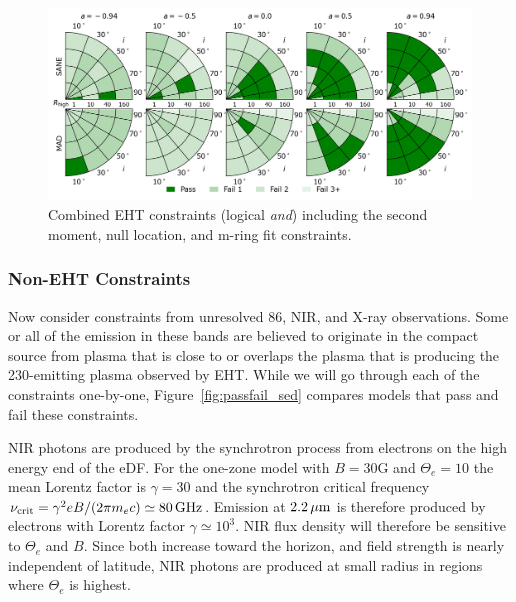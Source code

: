 \begin{figure}
  \centering
    \includegraphics[width=\textwidth]{./figures/Interferometric_Constraints.png}
  \caption{Combined EHT constraints (logical {\em and}) including the second moment, null location, and m-ring fit constraints.}
  \label{fig:all_EHT_constraints}
\end{figure}

\subsubsection{Non-EHT Constraints}

Now consider constraints from unresolved 86\GHz, NIR, and X-ray
observations.
Some or all of the emission in these bands are believed to originate
in the compact source from plasma that is close to or overlaps the
plasma that is producing the 230\GHz-emitting plasma observed by EHT.
While we will go through each of the constraints one-by-one,
Figure~\ref{fig:passfail_sed} compares models that pass and fail these
constraints.


NIR photons are produced by the synchrotron process from electrons on the high energy end of the eDF.  For the one-zone model with $B = 30$G and $\Theta_e = 10$ the mean Lorentz factor is $\gamma = 30$ and the synchrotron critical frequency $\nu_\mathrm{crit} = \gamma^2 e B/(2 \pi m_e c) \simeq 80\,\mathrm{GHz}$.  Emission at $2.2\,\mu\mathrm{m}$ is therefore produced by electrons with  Lorentz factor $\gamma \simeq 10^3$.  NIR flux density will therefore be sensitive to $\Theta_e$ and $B$.  Since both increase toward the horizon, and field strength is nearly independent of latitude, NIR photons are produced at small radius in regions where $\Theta_e$ is highest.


